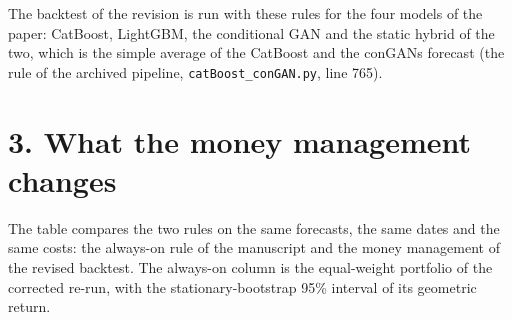 \documentclass[11pt,a4paper]{article}
\begin{document}
The backtest of the revision is run with these rules for the four models of
the paper: CatBoost, LightGBM, the conditional GAN and the static hybrid of
the two, which is the simple average of the CatBoost and the conGANs forecast
(the rule of the archived pipeline, \texttt{catBoost\_conGAN.py}, line 765).

\section*{3. What the money management changes}

The table compares the two rules on the same forecasts, the same dates and
the same costs: the always-on rule of the manuscript and the money management
of the revised backtest. The always-on column is the equal-weight portfolio of
the corrected re-run, with the stationary-bootstrap 95\% interval of its
geometric return.
\end{document}
